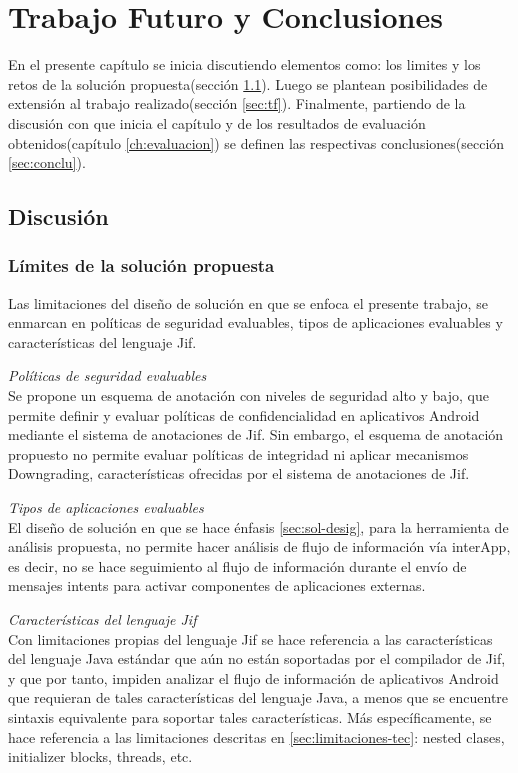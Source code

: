 \label{ch:trabajoFuturo}
\chapter{Trabajo Futuro y Conclusiones}

En el presente capítulo se inicia discutiendo elementos como: 
los limites y los retos de la solución propuesta(sección
\ref{sec:discu}).\newline 
Luego se plantean posibilidades de extensión al trabajo realizado(sección
\ref{sec:tf}).\newline
Finalmente, partiendo de la discusión con que inicia el capítulo y de los
resultados de evaluación obtenidos(capítulo \ref{ch:evaluacion}) se definen las
respectivas conclusiones(sección \ref{sec:conclu}).

\section{Discusión}
\label{sec:discu}
\subsection{Límites de la solución propuesta}
Las limitaciones del diseño de solución en que se enfoca el presente trabajo, se
enmarcan en políticas de seguridad evaluables, tipos de aplicaciones evaluables 
y características del lenguaje Jif.

\emph{Políticas de seguridad evaluables}\\
Se propone un esquema de anotación con niveles de seguridad alto y
bajo, que permite definir y evaluar políticas de confidencialidad en aplicativos
Android mediante el sistema de anotaciones de Jif.
Sin embargo, el esquema de anotación propuesto no permite evaluar políticas de
integridad ni aplicar mecanismos Downgrading, características ofrecidas por el
sistema de anotaciones de Jif.

\emph{Tipos de aplicaciones evaluables}\\
El diseño de solución en que se hace énfasis \ref{sec:sol-desig}, para la
herramienta de análisis propuesta, no permite hacer análisis de flujo de
información vía interApp, es decir, no se hace seguimiento al flujo de
información durante el envío de mensajes intents para activar componentes de
aplicaciones externas.

\emph{Características del lenguaje Jif}\\
Con limitaciones propias del lenguaje Jif se hace referencia a las
características del lenguaje Java estándar que aún no están soportadas por el
compilador de Jif, y que por tanto, impiden analizar el flujo de información de
aplicativos Android que requieran de tales características del lenguaje Java, a
menos que se encuentre sintaxis equivalente para soportar tales
características.\newline 
Más específicamente, se hace referencia a las limitaciones descritas en
\ref{sec:limitaciones-tec}: nested clases, initializer blocks, threads, etc.

